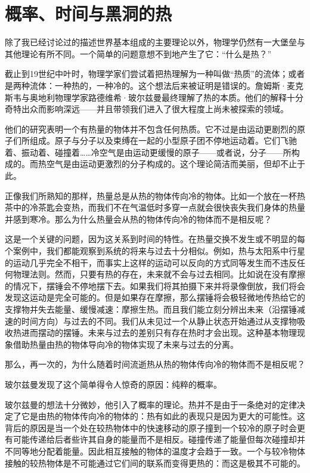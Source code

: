 	\chapter{概率、时间与黑洞的热}
\indent
   除了我已经讨论过的描述世界基本组成的主要理论以外，物理学仍然有一大堡垒与其他理论有所不同。一个简单的问题意想不到地产生了它：“什么是热？”

   截止到19世纪中叶时，物理学家们尝试着把热理解为一种叫做“热质”的流体；或者是两种流体：一种热的，一种冷的。这个想法后来被证明是错误的。詹姆斯·麦克斯韦与奥地利物理学家路德维希·玻尔兹曼最终理解了热的本质。他们的解释十分奇特出众而影响深远——并且带领我们进入了很大程度上尚未被探索的领域。

   他们的研究表明一个有热量的物体并不包含任何热质。它不过是由运动更剧烈的原子们所组成。原子与分子以及束缚在一起的小型原子团不停地运动着。它们飞驰着、振动着、碰撞着……冷空气是由运动更缓慢的原子——或者说，分子——所构成的。而热空气是由运动更激烈的分子构成的。这个理论简洁而美丽，但却不止于此。

   正像我们所熟知的那样，热量总是从热的物体传向冷的物体。比如一个放在一杯热茶中的冷茶匙会变热，而我们不在气温低时多穿一点就会很快丧失我们身体的热量并感到寒冷。那么为什么热量会从热的物体传向冷的物体而不是相反呢？

   这是一个关键的问题，因为这关系到时间的特性。在热量交换不发生或不明显的每个案例中，我们都能观察到系统的将来与过去十分相似。例如，热与太阳系中行星的运动几乎完全不相干，而事实上这样的运动可以反向的方式同等发生而不违反任何物理法则。然而，只要有热的存在，未来就不会与过去相同。比如说在没有摩擦的情况下，摆锤会不停地摆下去。如果我们将其拍摄下来并将录像倒放，我们将会发现这运动是完全可能的。但是如果存在摩擦，那么摆锤将会极轻微地传热给它的支撑物并失去能量、缓慢减速：摩擦生热。而且我们能立刻分辨出未来（沿摆锤减速的时间方向）与过去的不同。我们从未见过一个从静止状态开始通过从支撑物吸收热进而摆动的摆锤。未来与过去的差别只有存在热时才会出现。这种基本物理现象借助热量由热的物体导向冷的物体实现了未来与过去的分离。

   那么，再一次的，为什么随着时间流逝热从热的物体传向冷的物体而不是相反呢？

   玻尔兹曼发现了这个简单得令人惊奇的原因：纯粹的概率。

   玻尔兹曼的想法十分微妙，他引入了概率的理论。热并不是由于一条绝对的定律决定了它是由热的物体传向冷的物体的：热有如此的表现只是因为更大的可能性。这背后的原因是当一个处在较热物体中的快速移动的原子撞到一个较冷的原子时会更有可能传递给后者些许其自身的能量而不是相反。碰撞传递了能量但每次碰撞却并不同等地分配着能量。因此相互接触的物体的温度才会趋于一致。一个与较冷物体接触的较热物体是不可能通过它们间的联系而变得更热的：而这是极其不可能的。

